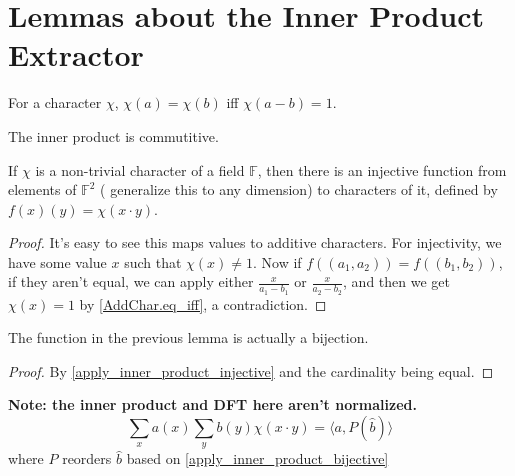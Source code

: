 \chapter{Lemmas about the Inner Product Extractor}
\label{chapr:cr}

\begin{proposition}
    \label{AddChar.eq_iff}
    \leanok
    For a character $\chi$, $\chi(a) = \chi(b)$ iff $\chi(a-b) = 1$.
\end{proposition}


\begin{proposition}
    \label{IP_comm}
    \leanok
    The inner product is commutitive.
\end{proposition}

\begin{lemma}
    \label{apply_inner_product_injective}
    \leanok
    If $\chi$ is a non-trivial character of a field $\mathbb{F}$, then there is an injective
    function from elements of $\mathbb{F}^2$ ({\color{red} generalize this to any dimension}) to characters of it, 
    defined by $f(x)(y) = \chi(x \cdot y)$.
\end{lemma}

\begin{proof}
    \leanok
    It's easy to see this maps values to additive characters.
    For injectivity, we have some value $x$ such that $\chi(x) \neq 1$.
    Now if $f((a_1, a_2)) = f((b_1, b_2))$, if they aren't equal, we can apply either
    $\frac{x}{a_1 - b_1}$ or $\frac{x}{a_2 - b_2}$, and then we get $\chi(x) = 1$ by \ref{AddChar.eq_iff},
    a contradiction.
\end{proof}

\begin{lemma}
    \label{apply_inner_product_bijective}
    \leanok
    The function in the previous lemma is actually a bijection.
\end{lemma}

\begin{proof}
    \leanok
    By \ref{apply_inner_product_injective} and the cardinality being equal.
\end{proof}

\begin{theorem}
    \label{bourgain_extractor_aux_inner}
    \leanok

    \textbf{Note: the inner product and DFT here aren't normalized.}
    $$\sum_x{a(x)\sum_y{b(y) \chi(x \cdot y)}} = \langle a, P(\hat b) \rangle$$
    where $P$ reorders $\hat b$ based on \ref{apply_inner_product_bijective}
\end{theorem}

